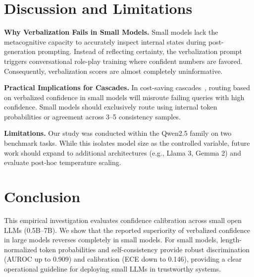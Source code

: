 \documentclass[10pt,twocolumn]{article}
\begin{document}
\section{Discussion and Limitations}
\textbf{Why Verbalization Fails in Small Models.} Small models lack the metacognitive capacity to accurately inspect internal states during post-generation prompting. Instead of reflecting certainty, the verbalization prompt triggers conversational role-play training where confident numbers are favored. Consequently, verbalization scores are almost completely uninformative.

\textbf{Practical Implications for Cascades.} In cost-saving cascades~\cite{zhang2026confidence}, routing based on verbalized confidence in small models will misroute failing queries with high confidence. Small models should exclusively route using internal token probabilities or agreement across 3--5 consistency samples.

\textbf{Limitations.} Our study was conducted within the Qwen2.5 family on two benchmark tasks. While this isolates model size as the controlled variable, future work should expand to additional architectures (e.g., Llama 3, Gemma 2) and evaluate post-hoc temperature scaling.

\section{Conclusion}
This empirical investigation evaluates confidence calibration across small open LLMs (0.5B--7B). We show that the reported superiority of verbalized confidence in large models reverses completely in small models. For small models, length-normalized token probabilities and self-consistency provide robust discrimination (AUROC up to 0.909) and calibration (ECE down to 0.146), providing a clear operational guideline for deploying small LLMs in trustworthy systems.

{\footnotesize
\let\oldbibliography\thebibliography
\renewcommand{\thebibliography}[1]{%
  \oldbibliography{#1}%
  \setlength{\itemsep}{0pt}%
  \setlength{\parskip}{0pt}%
}


}
\end{document}
